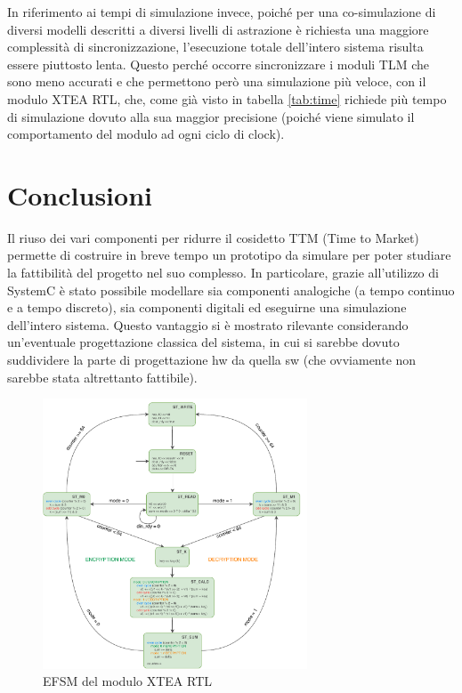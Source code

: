 \documentclass[]{IEEEtran}
\begin{document}
In riferimento ai tempi di simulazione invece, poich\'e per una co-simulazione di diversi modelli descritti a diversi 
livelli di astrazione \`e richiesta una maggiore complessit\`a di sincronizzazione, l'esecuzione totale dell'intero 
sistema risulta essere piuttosto lenta. Questo perch\'e occorre sincronizzare i moduli TLM che sono meno accurati e che 
permettono per\`o una simulazione pi\`u veloce, con il modulo XTEA RTL, che, come gi\`a visto in tabella \ref{tab:time} 
richiede pi\`u tempo di simulazione dovuto alla sua maggior precisione (poich\'e viene simulato il comportamento del modulo ad
ogni ciclo di clock).


\section{Conclusioni}
Il riuso dei vari componenti per ridurre il cosidetto TTM (Time to Market) permette di costruire in breve tempo un 
prototipo da simulare per poter studiare la fattibilit\`a del progetto nel suo complesso. In particolare, grazie 
all'utilizzo di SystemC \`e stato possibile modellare sia componenti analogiche (a tempo continuo e a tempo discreto), sia 
componenti digitali ed eseguirne una simulazione dell'intero sistema. Questo vantaggio  si \`e mostrato rilevante 
considerando un'eventuale progettazione classica del sistema, in cui si sarebbe dovuto suddividere la parte di 
progettazione hw da quella sw (che ovviamente non sarebbe stata altrettanto fattibile).





\begin{figure}[bt]
	\centering
	\includegraphics[width=0.7\textwidth]{figures/efsm.pdf}
	\caption{EFSM del modulo XTEA RTL}
	\label{fig:efsm}
\end{figure}
\end{document}
